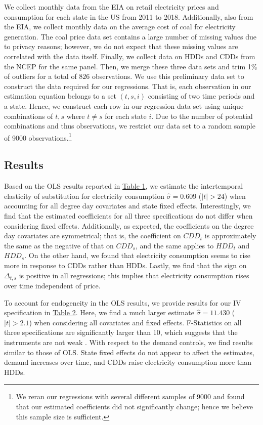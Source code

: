 \documentclass[12pt,a4paper]{extarticle}
\begin{document}
We collect monthly data from the EIA on retail electricity prices and consumption for each state in the US from 2011 to 2018. Additionally, also from the EIA, we collect monthly data on the average cost of coal for electricity generation. The coal price data set contains a large number of missing values due to privacy reasons; however, we do not expect that these missing values are correlated with the data itself. Finally, we collect data on HDDs and CDDs from the NCEP for the same panel. Then, we merge these three data sets and trim 1\% of outliers for a total of $826$ observations. We use this preliminary data set to construct the data required for our regressions. That is, each observation in our estimation equation belongs to a set $(t,s,i)$ consisting of two time periods and a state. Hence, we construct each row in our regression data set using unique combinations of $t,s$ where $t \neq s$ for each state $i$. Due to the number of potential combinations and thus observations, we restrict our data set to a random sample of 9000 observations.\footnote{We reran our regressions with several different samples of 9000 and found that our estimated coefficients did not significantly change; hence we believe this sample size is sufficient.}

\subsection{Results}

Based on the OLS results reported in \hyperref[table:1]{Table 1}, we estimate the intertemporal elasticity of substitution for electricity consumption $\hat{\sigma}  = 0.609$ ($|t| > 24$) when accounting for all degree day covariates and state fixed effects. Interestingly, we find that the estimated coefficients for all three specifications do not differ when considering fixed effects. Additionally, as expected, the coefficients on the degree day covariates are symmetrical; that is, the coefficient on $CDD_{t}$ is approximately the same as the negative of that on $CDD_{s}$, and the same applies to $HDD_{t}$ and $HDD_{s}$. On the other hand, we found that electricity consumption seems to rise more in response to CDDs rather than HDDs. Lastly, we find that the sign on $\Delta_{t,s}$ is positive in all regressions; this implies that electricity consumption rises over time independent of price. 

To account for endogeneity in the OLS results, we provide results for our IV specification in \hyperref[table:2]{Table 2}. Here, we find a much larger estimate $\hat{\sigma}  = 11.430$ ($|t| > 2.1$) when considering all covariates and fixed effects. F-Statistics on all three specifications are significantly larger than 10, which suggests that the instruments are not weak \citep{SS1997}. With respect to the demand controls, we find results similar to those of OLS. State fixed effects do not appear to affect the estimates, demand increases over time, and CDDs raise electricity consumption more than HDDs. 
\end{document}
